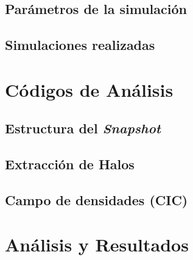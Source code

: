 \subsection{Parámetros de la simulación}

\subsection{Simulaciones realizadas}
\label{sub:simulaciones}


\section{Códigos de Análisis}

\subsection{Estructura del \textit{Snapshot}}

\subsection{Extracción de Halos}



\subsection{Campo de densidades (CIC)}
\label{sub:CIC}

\section{Análisis y Resultados}
